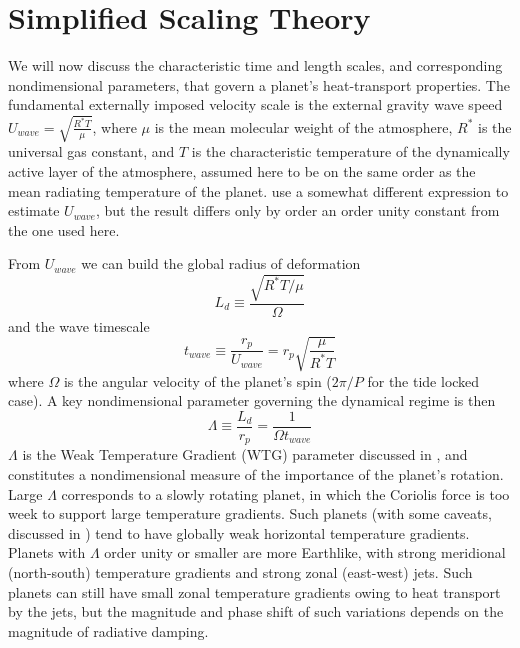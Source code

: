 



\section{Simplified Scaling Theory}


We will now discuss the characteristic time  and length scales, and corresponding nondimensional parameters, that govern a planet's heat-transport properties. The fundamental externally imposed velocity scale is the external gravity wave speed $U_{wave} = \sqrt{\frac{R^* T}{\mu}}$, where $\mu$ is the mean molecular weight of the atmosphere, $R^*$ is the universal gas constant, and $T$ is the characteristic temperature of the dynamically active layer of the atmosphere, assumed here to be on the same order as the mean radiating temperature of the planet.  \citet{zhang2016effects} use a somewhat different expression to estimate $U_{wave}$, but the result differs only by order an order unity constant from the one used here.

From $U_{wave}$ we can build the global radius of deformation
\begin{equation}
L_{d} \equiv \frac{\sqrt{R^{*}T/\mu}}{\Omega}
\end{equation}
and the wave timescale
\begin{equation}
t_{wave} \equiv \frac{r_p}{U_{wave}} = r_p \sqrt{\frac{\mu}{R^{*} T}}
\end{equation}
where  $\Omega$ is the angular velocity of the planet's spin ($2\pi/P$ for the tide locked case). A key nondimensional parameter governing the dynamical regime is then
\begin{equation}
\Lambda \equiv \frac{L_{d}}{r_{p}} = \frac{1}{\Omega t_{wave}}
\end{equation}
$\Lambda$ is the Weak Temperature Gradient (WTG) parameter discussed in \citet{pierrehumbert2016dynamics} , and constitutes a nondimensional measure of the importance of the planet's rotation.  Large $\Lambda$ corresponds to a slowly rotating planet, in which the Coriolis force is too week to support large temperature gradients. Such planets (with some caveats, discussed in \citet{pierrehumbert2016dynamics}) tend to have globally weak horizontal temperature gradients. Planets with $\Lambda$ order unity or smaller are more Earthlike, with strong meridional (north-south) temperature gradients and strong zonal (east-west) jets.  Such planets can still have small zonal temperature gradients owing to heat transport by the jets, but the magnitude and phase shift of such variations depends on the magnitude of radiative damping.

